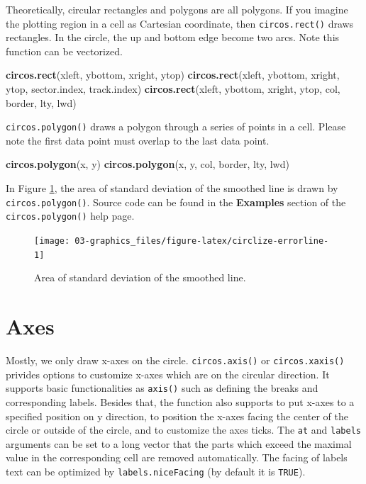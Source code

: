 \documentclass[]{book}
\newenvironment{Shaded}{\begin{snugshade}}{\end{snugshade}}
\newcommand{\KeywordTok}[1]{\textcolor[rgb]{0.13,0.29,0.53}{\textbf{#1}}}
\newcommand{\NormalTok}[1]{#1}
\theoremstyle{definition}
\theoremstyle{definition}
\theoremstyle{remark}
\begin{document}
Theoretically, circular rectangles and polygons are all polygons. If you
imagine the plotting region in a cell as Cartesian coordinate, then
\texttt{circos.rect()} draws rectangles. In the circle, the up and
bottom edge become two arcs. Note this function can be vectorized.

\begin{Shaded}
\begin{Highlighting}[]
\KeywordTok{circos.rect}\NormalTok{(xleft, ybottom, xright, ytop)}
\KeywordTok{circos.rect}\NormalTok{(xleft, ybottom, xright, ytop, sector.index, track.index)}
\KeywordTok{circos.rect}\NormalTok{(xleft, ybottom, xright, ytop, col, border, lty, lwd)}
\end{Highlighting}
\end{Shaded}

\texttt{circos.polygon()} draws a polygon through a series of points in
a cell. Please note the first data point must overlap to the last data
point.

\begin{Shaded}
\begin{Highlighting}[]
\KeywordTok{circos.polygon}\NormalTok{(x, y)}
\KeywordTok{circos.polygon}\NormalTok{(x, y, col, border, lty, lwd)}
\end{Highlighting}
\end{Shaded}

In Figure \ref{fig:circlize-errorline}, the area of standard deviation
of the smoothed line is drawn by \texttt{circos.polygon()}. Source code
can be found in the \textbf{Examples} section of the
\texttt{circos.polygon()} help page.

\begin{figure}

{\centering \texttt{[image: 03-graphics\_files/figure-latex/circlize-errorline-1]} 

}

\caption{Area of standard deviation of the smoothed line.}\label{fig:circlize-errorline}
\end{figure}

\section{Axes}\label{axes}

Mostly, we only draw x-axes on the circle. \texttt{circos.axis()} or
\texttt{circos.xaxis()} privides options to customize x-axes which are
on the circular direction. It supports basic functionalities as
\texttt{axis()} such as defining the breaks and corresponding labels.
Besides that, the function also supports to put x-axes to a specified
position on y direction, to position the x-axes facing the center of the
circle or outside of the circle, and to customize the axes ticks. The
\texttt{at} and \texttt{labels} arguments can be set to a long vector
that the parts which exceed the maximal value in the corresponding cell
are removed automatically. The facing of labels text can be optimized by
\texttt{labels.niceFacing} (by default it is \texttt{TRUE}).
\end{document}
